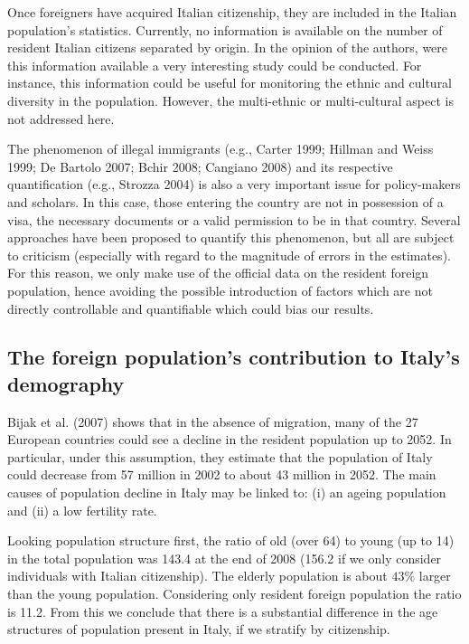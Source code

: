 \documentclass[10pt] {article}
\theoremstyle{definition}
\theoremstyle{plain}
\begin{document}
Once foreigners have acquired Italian citizenship, they are included in the Italian population's statistics. Currently, no information is available on the number of resident Italian citizens separated by origin. In the opinion of the authors, were this information available a very interesting study could be conducted. For instance, this information could be useful for monitoring the ethnic and cultural diversity in the population. However, the multi-ethnic or multi-cultural aspect is not addressed here.

The phenomenon of illegal immigrants (e.g., Carter 1999; Hillman and Weiss 1999; De Bartolo 2007; Bchir 2008; Cangiano 2008) and its respective quantification (e.g., Strozza 2004) is also a very important issue for policy-makers and scholars. In this case, those entering the country are not in possession of a visa, the necessary documents or a valid permission to be in that country. Several approaches have been proposed to quantify this phenomenon, but all are subject to criticism (especially with regard to the magnitude of errors in the estimates). For this reason, we only make use of the official data on the resident foreign population, hence avoiding the possible introduction of factors which are not directly controllable and quantifiable which could bias our results. 


\subsection{The foreign population's contribution to Italy's demography \label{DEM}}

Bijak et al. (2007) shows that in the absence of migration, many of the 27 European countries could see a decline in the resident population up to 2052. In particular, under this assumption, they estimate that the population of Italy could decrease from 57 million in 2002 to about 43 million in 2052. The main causes of population decline in Italy may be linked to: (i) an ageing population and (ii) a low fertility rate. 

Looking population structure first, the ratio of old (over 64) to young (up to 14) in the total population was 143.4 at the end of 2008 (156.2 if we only consider individuals with Italian citizenship). The elderly population is about $43\%$ larger than the young population. Considering only resident foreign population the ratio is 11.2. From this we conclude that there is a substantial difference in the age structures of population present in Italy, if we stratify by citizenship.
\end{document}
